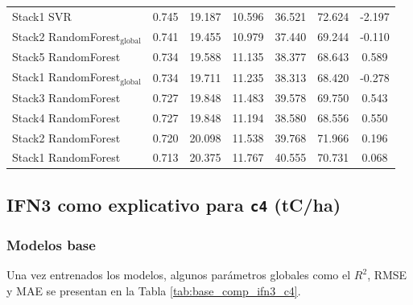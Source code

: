 \begin{table}[tp]
{\begin{tabular}{p{4.5cm}cccccc}
        Stack1 SVR & 0.745 & 19.187 & 10.596 & 36.521 & 72.624 & -2.197 \\
        Stack2 RandomForest$_{\text{global}}$ & 0.741 & 19.455 & 10.979 & 37.440 & 69.244 & -0.110 \\
        Stack5 RandomForest & 0.734 & 19.588 & 11.135 & 38.377 & 68.643 & 0.589 \\
        Stack1 RandomForest$_{\text{global}}$ & 0.734 & 19.711 & 11.235 & 38.313 & 68.420 & -0.278 \\
        Stack3 RandomForest & 0.727 & 19.848 & 11.483 & 39.578 & 69.750 & 0.543 \\
        Stack4 RandomForest & 0.727 & 19.848 & 11.194 & 38.580 & 68.556 & 0.550 \\
        Stack2 RandomForest & 0.720 & 20.098 & 11.538 & 39.768 & 71.966 & 0.196 \\
        Stack1 RandomForest & 0.713 & 20.375 & 11.767 & 40.555 & 70.731 & 0.068 \\
            \bottomrule
    \end{tabular}
    }
\end{table}


\clearpage
\subsection{IFN3 como explicativo para \texttt{c4} (tC/ha)}

\subsubsection{Modelos base}

Una vez entrenados los modelos, algunos parámetros globales como el $R^2$, RMSE y MAE se presentan en la Tabla \ref{tab:base_comp_ifn3_c4}.

